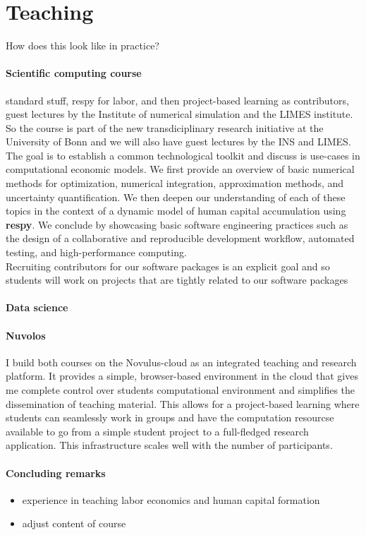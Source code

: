 \section{Teaching}

How does this look like in practice?

\paragraph{Scientific computing course} standard stuff, respy for labor, and then project-based learning as contributors, guest lectures by the Institute of numerical simulation and the LIMES institute. So the course is part of the new transdiciplinary research initiative at the University of Bonn and we will also have guest lectures by the INS and LIMES. The goal is to establish a common technological toolkit and discuss is use-cases in computational economic models. We first provide an overview of basic numerical methods for optimization, numerical integration, approximation methods, and uncertainty quantification. We then deepen our understanding of each of these topics in the context of a dynamic model of human capital accumulation using \textbf{respy}. We conclude by showcasing basic software engineering practices such as the design of a collaborative and reproducible development workflow, automated testing, and high-performance computing.\\

\noindent Recruiting contributors for our software packages is an explicit goal and so students will work on projects that are tightly related to our software packages

\paragraph{Data science}

\paragraph{Nuvolos} I build both courses on the Novulus-cloud as an integrated teaching and research platform. It provides a simple, browser-based environment in the cloud that gives me complete control over students computational environment and simplifies the dissemination of teaching material. This allows for a project-based learning where students can seamlessly work in groups and have the computation resourcse available to go from a simple student project to a full-fledged research application. This infrastructure scales well with the number of participants.

\paragraph{Concluding remarks}

\begin{itemize}
\item experience in teaching labor economics and human capital formation
\item adjust content of course
\end{itemize}
